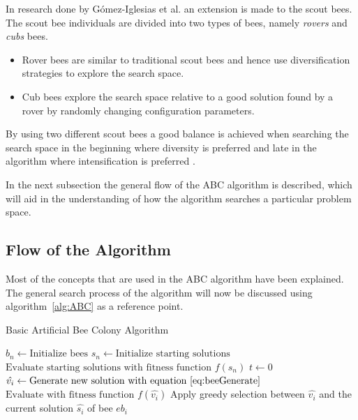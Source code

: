In research done by G\'{o}mez-Iglesias et al. \cite{ABCFusionGrid} an extension is made to the scout bees. The scout bee individuals are divided into two types of bees, namely \emph{rovers} and \emph{cubs} bees\cite{ABCFusionGrid}.
\begin{itemize}
\item{Rover bees} are similar to traditional scout bees and hence use diversification strategies to explore the search space. 
\item {Cub bees} explore the search space relative to a good solution found by a rover by randomly changing configuration parameters. 
\end{itemize}
By using two different scout bees a good balance is achieved when searching the search space in the beginning where diversity is preferred and late in the algorithm where intensification is preferred \cite{ABCFusionGrid}.

In the next subsection the general flow of the \gls{ABC} algorithm is described, which will aid in the understanding of how the algorithm searches a particular problem space. 
\subsection{Flow of the Algorithm}
Most of the concepts that are used in the \gls{ABC} algorithm have been explained. The general search process of the algorithm will now be discussed using algorithm~\ref{alg:ABC} as a reference point.
\begin{algorithm}[H]
\caption{Basic Artificial Bee Colony Algorithm\cite{ABCCompareStudy}}
\label{alg:ABC}
	\begin{algorithmic}[1]
		\State$b_n \leftarrow \text{Initialize bees}$
		\State$s_n \leftarrow \text{Initialize starting solutions}$
		\State$\text{Evaluate starting solutions with fitness function $f(s_n)$}$
		\State$t \leftarrow 0$
				\State$\hat{v_i} \leftarrow \text{Generate new solution with equation~\ref{eq:beeGenerate}}$
				\State$\text{Evaluate with fitness function $f(\hat{v_i})$}$
				\State Apply greedy selection between $\hat{v_i}$ and the current solution $\hat{s_i}$ of bee $eb_i$
			\EndFor
	\end{algorithmic}
\addtocounter{algorithm}{-1}
\end{algorithm}


